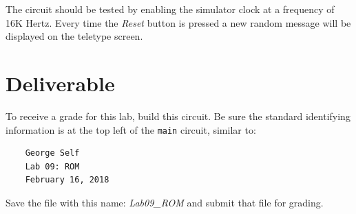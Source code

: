 The circuit should be tested by enabling the simulator clock at a frequency of 16K Hertz. Every time the \textit{Reset} button is pressed a new random message will be displayed on the teletype screen.

\section{Deliverable}

To receive a grade for this lab, build this circuit. Be sure the standard identifying information is at the top left of the \lstinline{main} circuit, similar to: 

\bigskip
\begin{minipage}{\linewidth}
	\begin{verbatim}
	George Self
	Lab 09: ROM
	February 16, 2018
	\end{verbatim}
\end{minipage}
\bigskip

Save the file with this name: \textit{Lab09\_ROM} and submit that file for grading.

